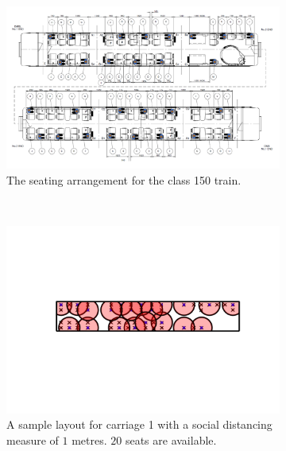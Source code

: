 \documentclass[11pt,a4paper]{article}
\begin{document}
\begin{figure}[ht!]
\centering

\vspace{-1.5cm}

\begin{subfigure}[h]{0.95\linewidth}
\centering
\includegraphics[scale = 0.6]{floorplan150.png}
\caption{The seating arrangement for the class 150 train.}
\label{Reference}
\end{subfigure}
~
\begin{subfigure}[h]{0.49\linewidth}
\centering
\includegraphics[width = \linewidth]{class150_first_car_1m.png}
\caption{A sample layout for carriage 1 with a social distancing measure of $1$ metres. $20$ seats are available.}
\label{OneMetre1}
\end{subfigure}
~
\begin{subfigure}[h]{0.490\linewidth}
\centering

\end{subfigure}
\end{figure}
\end{document}
